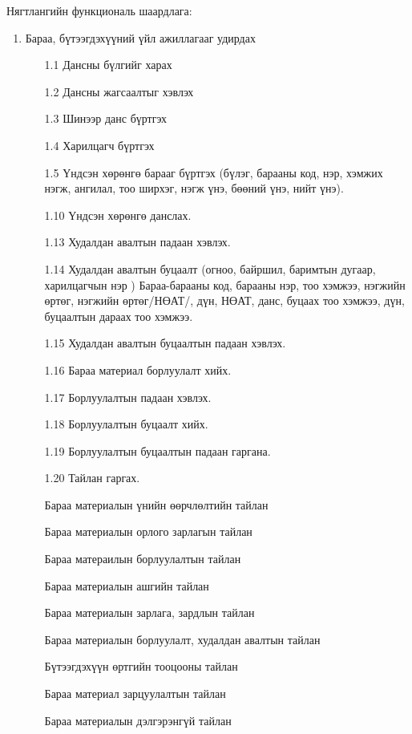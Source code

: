 Нягтлангийн функциональ шаардлага:
\begin{enumerate}
	\item  Бараа, бүтээгдэхүүний үйл ажиллагааг удирдах
	\begin{enumerate}
		\item[1.1]  Дансны бүлгийг харах
		\item[1.2]  Дансны жагсаалтыг хэвлэх
		\item[1.3] Шинээр данс бүртгэх
	    \item[1.4]  Харилцагч бүртгэх
	    \item[1.5] Үндсэн хөрөнгө барааг бүртгэх (бүлэг, барааны код, нэр, хэмжих нэгж,  ангилал, тоо ширхэг, нэгж үнэ, бөөний үнэ, нийт үнэ).
	  	\item[1.10] Үндсэн хөрөнгө данслах.
	  	\item[1.13] Худалдан авалтын падаан хэвлэх. 
	  	\item[1.14] 	Худалдан авалтын буцаалт (огноо, байршил, баримтын дугаар, харилцагчын нэр )
	  	Бараа-барааны код, барааны нэр, тоо хэмжээ, нэгжийн өртөг, нэгжийн өртөг/НӨАТ/, дүн, НӨАТ, данс, буцаах тоо хэмжээ, дүн, буцаалтын дараах тоо хэмжээ.
	  	\item[1.15] Худалдан авалтын буцаалтын падаан хэвлэх.
	  	\item[1.16] Бараа материал борлуулалт хийх.
	  	\item[1.17] Борлуулалтын падаан хэвлэх.
	  	\item[1.18]	Борлуулалтын буцаалт хийх.
	  	\item[1.19]	Борлуулалтын буцаалтын падаан гаргана.
	  	\item[1.20] Тайлан гаргах.
	  	
	  	Бараа материалын үнийн өөрчлөлтийн тайлан
	  	
	  	Бараа материалын орлого зарлагын тайлан
	  	
	  	Бараа матераилын борлуулалтын тайлан
	  	
	  	Бараа материалын ашгийн тайлан
	  	
	  	Бараа материалын зарлага, зардлын тайлан
	  	
	  	Бараа материалын борлуулалт, худалдан авалтын тайлан
	  	
	  	Бүтээгдэхүүн өртгийн тооцооны тайлан
	  	
	  	Бараа материал зарцуулалтын тайлан
	  	
	  	Бараа материалын дэлгэрэнгүй тайлан
	  	\end{enumerate}
\end{enumerate}
